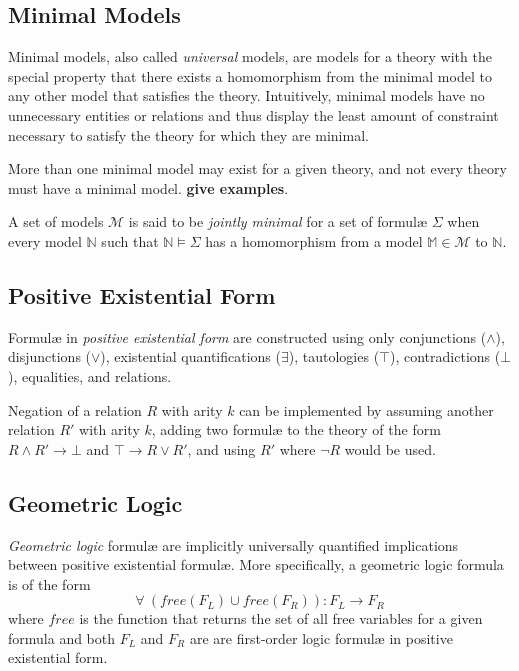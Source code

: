 	\subsection{Minimal Models}

		Minimal models, also called \emph{universal} models, are models for a
		theory with the special property that there exists a homomorphism from
		the minimal model to any other model that satisfies the theory.
		Intuitively, minimal models have no unnecessary entities or relations
		and thus display the least amount of constraint necessary to satisfy
		the theory for which they are minimal.

		More than one minimal model may exist for a given theory, and not every
		theory must have a minimal model. \textbf{give examples}.

		A set of models $\mathcal{M}$ is said to be \emph{jointly minimal} for
		a set of formul{\ae} $\Sigma$ when every model $\mathbb{N}$ such that
		$\mathbb{N} \models \Sigma$ has a homomorphism from a model $\mathbb{M}
		\in \mathcal{M}$ to $\mathbb{N}$.

	\subsection{Positive Existential Form}

		Formul{\ae} in \emph{positive existential form} are constructed using
		only conjunctions ($\wedge$), disjunctions ($\vee$), existential
		quantifications ($\exists$), tautologies ($\top$), contradictions
		($\bot$), equalities, and relations.

		Negation of a relation $R$ with arity $k$ can be implemented by
		assuming another relation $R'$ with arity $k$, adding two formul{\ae}
		to the theory of the form $R \wedge R' \to \bot$ and $\top \to R \vee
		R'$, and using $R'$ where $\neg R$ would be used.

	\subsection{Geometric Logic}
	\label{sec:technical_background.geometric_logic}

		\emph{Geometric logic} formul{\ae} are implicitly universally
		quantified implications between positive existential formul{\ae}. More
		specifically, a geometric logic formula is of the form
		\[\forall\ (free(F_L) \cup free(F_R)) : F_L \to F_R\]
		where $free$ is the function that returns the set of all free variables
		for a given formula and both $F_L$ and $F_R$ are are first-order logic
		formul{\ae} in positive existential form.

